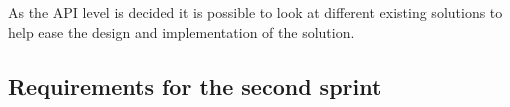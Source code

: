 As the API level is decided it is possible to look at different existing solutions to help ease the design and implementation of the solution.






\subsection{Requirements for the second sprint}
